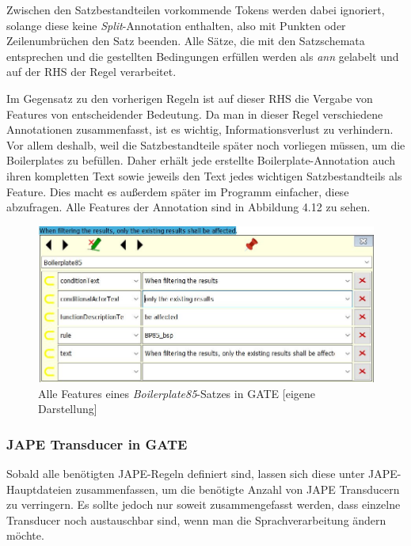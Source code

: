 \documentclass[12pt]{report}
\begin{document}
Zwischen den Satzbestandteilen vorkommende Tokens werden dabei ignoriert, solange diese keine \textit{Split}-Annotation enthalten, also mit Punkten oder Zeilenumbrüchen den Satz beenden. Alle Sätze, die mit den Satzschemata entsprechen und die gestellten Bedingungen erfüllen werden als \textit{ann} gelabelt und auf der RHS der Regel verarbeitet.

Im Gegensatz zu den vorherigen Regeln ist auf dieser RHS die Vergabe von Features von entscheidender Bedeutung. Da man in dieser Regel verschiedene Annotationen zusammenfasst, ist es wichtig, Informationsverlust zu verhindern. Vor allem deshalb, weil die Satzbestandteile später noch vorliegen müssen, um die Boilerplates zu befüllen. Daher erhält jede erstellte Boilerplate-Annotation auch ihren kompletten Text sowie jeweils den Text jedes wichtigen Satzbestandteils als Feature. Dies macht es außerdem später im Programm einfacher, diese abzufragen. Alle Features der Annotation sind in Abbildung 4.12 zu sehen. 

\begin{figure}[H]
\begin{center}
\includegraphics[scale=0.8]{Bilder/BP85Features.jpg}
\caption{Alle Features eines \textit{Boilerplate85}-Satzes in GATE [eigene Darstellung]}
\end{center}
\end{figure}

\subsubsection{JAPE Transducer in GATE}
Sobald alle benötigten JAPE-Regeln definiert sind, lassen sich diese unter JAPE-Hauptdateien zusammenfassen, um die benötigte Anzahl von JAPE Transducern zu verringern. Es sollte jedoch nur soweit zusammengefasst werden, dass einzelne Transducer noch austauschbar sind, wenn man die Sprachverarbeitung ändern möchte. 
\end{document}
